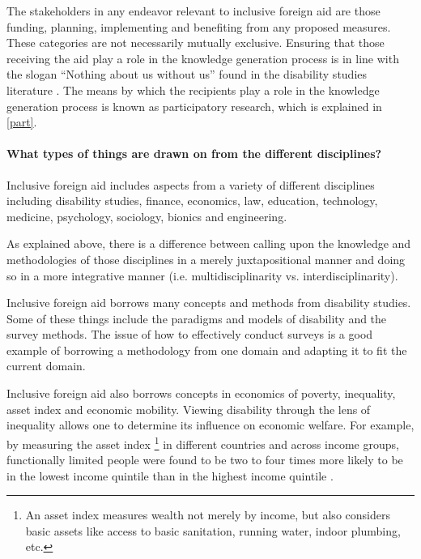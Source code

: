 \documentclass[a4paper]{article}
\begin{document}
The stakeholders in any endeavor relevant to inclusive foreign aid are those
funding, planning, implementing and benefiting from any proposed measures.
These categories are not necessarily mutually exclusive. Ensuring that those
receiving the aid play a role in the knowledge generation process is in line
with the slogan ``Nothing about us without us'' found in the disability
studies literature \citep{pfeiffer2000disability}. The means by which the
recipients play a role in the knowledge generation process is known as
participatory research, which is explained in \autoref{part}.

\paragraph{What types of things are drawn on from the different disciplines?}

Inclusive foreign aid includes aspects from a variety of different disciplines
including disability studies, finance, economics, law, education, technology,
medicine, psychology, sociology, bionics and engineering. 

As explained above, there is a difference between calling upon the knowledge and
methodologies of those disciplines in a merely juxtapositional manner and
doing so in a more integrative manner (i.e. multidisciplinarity vs.
interdisciplinarity).

Inclusive foreign aid borrows many concepts and methods from disability
studies. Some of these things include the paradigms and models of disability
and the survey methods. The issue of how to effectively conduct surveys is a
good example of borrowing a methodology from one domain and adapting it to fit
the current domain. 

Inclusive foreign aid also borrows concepts in economics of poverty,
inequality, asset index and economic mobility. Viewing disability through the
lens of inequality allows one to determine its influence on economic welfare.
For example, by measuring the asset index \footnote{An asset index measures
wealth not merely by income, but also considers basic assets like access to
basic sanitation, running water, indoor plumbing, etc.} in different countries
and across income groups, functionally limited people were found to be two to
four times more likely to be in the lowest income quintile than in the highest
income quintile \citep{mitra2018disability}.  
\end{document}

